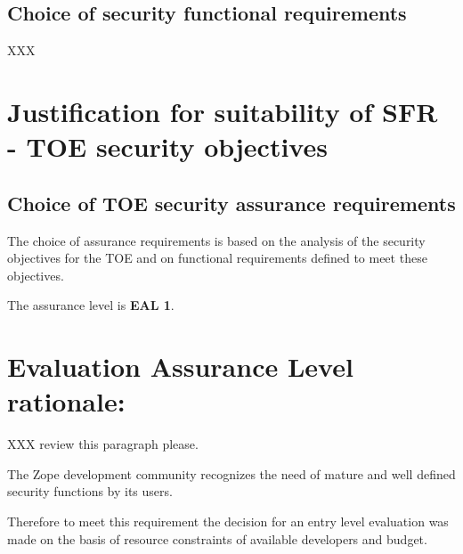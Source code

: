 \documentclass[12pt,english]{scrbook}
\begin{document}






\subsection{Choice of security functional requirements}

XXX





\section{Justification for suitability of SFR - TOE security objectives}





\subsection{Choice of TOE security assurance requirements}

The choice of assurance requirements is based on the analysis of the security
objectives for the TOE and on functional requirements defined to meet these
objectives.

The assurance level is \textbf{EAL 1}.





\section{Evaluation Assurance Level rationale:}

XXX review this paragraph please.

The Zope development community recognizes the need of mature and well defined
security functions by its users.

Therefore to meet this requirement the decision for an entry level evaluation
was made on the basis of resource constraints of available developers and
budget.
\end{document}
